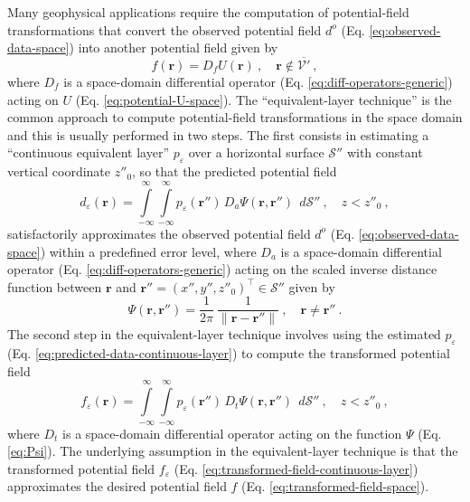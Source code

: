 Many geophysical applications require the computation of potential-field transformations that convert the
observed potential field $d^{o}$ (Eq. \ref{eq:observed-data-space}) into another potential field 
given by
\begin{equation}
	f(\mathbf{r}) = D_{f} U(\mathbf{r}) \: , 
	\quad \mathbf{r} \notin \overline{\mathcal{V}'} \: ,
	\label{eq:transformed-field-space}
\end{equation}
where $D_{f}$ is a space-domain differential operator 
(Eq. \ref{eq:diff-operators-generic}) acting on $U$ (Eq. \ref{eq:potential-U-space}).
The ``equivalent-layer technique'' is the common approach to compute potential-field transformations
in the space domain and this is usually performed in two steps.
The first consists in estimating a ``continuous equivalent layer'' $p_{\varepsilon}$ 
\citep{oliveirajr_etal2026_1} over a horizontal surface $\mathcal{S}''$ with constant vertical
coordinate $z''_{0}$, so that the predicted potential field
\begin{equation}
	d_{\varepsilon}(\mathbf{r})
	= \int\limits_{-\infty}^{\infty}\int\limits_{-\infty}^{\infty}
	p_{\varepsilon}(\mathbf{r}'') \, D_{a} \Psi(\mathbf{r}, \mathbf{r}'') \:\: d\mathcal{S}''
	\: , \quad z < z''_{0} \: ,
	\label{eq:predicted-data-continuous-layer}
\end{equation}
satisfactorily approximates the observed potential field $d^{o}$ 
(Eq. \ref{eq:observed-data-space}) within a predefined error level,
where $D_{a}$ is a space-domain differential operator 
(Eq. \ref{eq:diff-operators-generic}) acting on the scaled inverse 
distance function between $\mathbf{r}$ and 
$\mathbf{r}'' = (x'', y'', z''_{0})^{\top} \in \mathcal{S}''$ given by
\begin{equation}
	\Psi(\mathbf{r}, \mathbf{r}'') = 
	\frac{1}{2\pi} \: 
	\frac{1}{\| \mathbf{r} - \mathbf{r}'' \|} \: , 
	\quad \mathbf{r} \ne \mathbf{r}'' \: .
	\label{eq:Psi}
\end{equation}
The second step in the equivalent-layer technique involves using the estimated $p_{\varepsilon}$ 
(Eq. \ref{eq:predicted-data-continuous-layer}) to compute the transformed potential field
\begin{equation}
	f_{\varepsilon}(\mathbf{r})
	= \int\limits_{-\infty}^{\infty}\int\limits_{-\infty}^{\infty}
	p_{\varepsilon}(\mathbf{r}'') \, D_{t}\Psi(\mathbf{r}, \mathbf{r}'') \:\: d\mathcal{S}'' 
	\: , \quad z < z''_{0} \: ,
	\label{eq:transformed-field-continuous-layer}
\end{equation}
where $D_{t}$ is a space-domain differential operator acting on the function 
$\Psi$ (Eq. \ref{eq:Psi}).
The underlying assumption in the equivalent-layer technique is that the transformed potential 
field $f_{\varepsilon}$ (Eq. \ref{eq:transformed-field-continuous-layer}) approximates 
the desired potential field $f$ (Eq. \ref{eq:transformed-field-space}).

